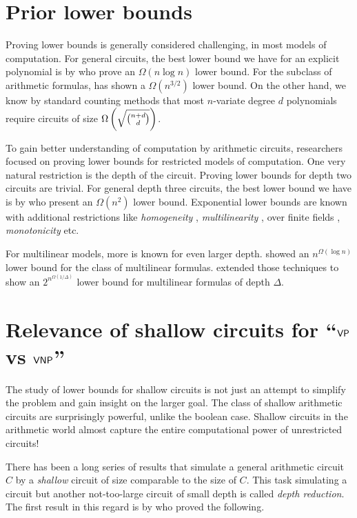 \section{Prior lower bounds}

Proving lower bounds is generally considered challenging, in most models of computation. 
For general circuits, the best lower bound we have for an explicit polynomial is by \cite{BS83} who prove an $\Omega(n\log n)$ lower bound. 
For the subclass of arithmetic formulas, \cite{k85} has shown a $\Omega(n^{3/2})$ lower bound. 
On the other hand, we know by standard counting methods that most $n$-variate degree $d$ polynomials require circuits of size $\Omega\left(\sqrt{\binom{n+d}{d}}\right)$.

To gain better understanding of computation by arithmetic circuits, researchers focused on proving lower bounds for restricted models of computation. 
One very natural restriction is the depth of the circuit. 
Proving lower bounds for depth two circuits are trivial. 
For general depth three circuits, the best lower bound we have is by \cite{sw2001} who present an $\Omega(n^2)$ lower bound. 
Exponential lower bounds are known with additional restrictions like \emph{homogeneity} \cite{nw1997}, \emph{multilinearity} \cite{raz2004,raz-yehudayoff}, over finite fields \cite{gr00,grigoriev98}, \emph{monotonicity} \cite{js82} etc. 

For multilinear models, more is known for even larger depth. \cite{raz2004} showed an $n^{\Omega(\log n)}$ lower bound for the class of multilinear formulas. \cite{raz-yehudayoff} extended those techniques to show an $2^{n^{\Omega(1/\Delta)}}$ lower bound for multilinear formulas of depth $\Delta$. 

\section{Relevance of shallow circuits for ``$\mathsf{VP}$ vs $\mathsf{VNP}$''}

The study of lower bounds for shallow circuits is not just an attempt to simplify the problem and gain insight on the larger goal. 
The class of shallow arithmetic circuits are surprisingly powerful, unlike the boolean case. 
Shallow circuits in the arithmetic world almost capture the entire computational power of unrestricted circuits! 

There has been a long series of results that simulate a general arithmetic circuit $C$ by a \emph{shallow} circuit of size comparable to the size of $C$. 
This task simulating a circuit but another not-too-large circuit of small depth is called \emph{depth reduction}. 
The first result in this regard is by \cite{vsbr83} who proved the following. 

